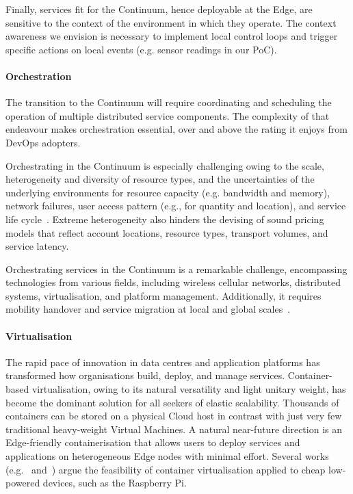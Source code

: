 Finally, services fit for the Continuum, hence deployable at the Edge, are sensitive to the context of the environment in which they operate.
The context awareness we envision is necessary to implement local control loops and trigger specific actions on local events (e.g. sensor readings in our PoC).

\paragraph{Orchestration}\label{p:orchestration}

The transition to the Continuum will require coordinating and scheduling the operation of multiple distributed service components. The complexity of that endeavour makes orchestration essential, over and above the rating it enjoys from DevOps adopters. 

Orchestrating in the Continuum is especially challenging owing to the scale, heterogeneity and diversity of resource types, and the uncertainties of the underlying environments for resource capacity (e.g. bandwidth and memory), network failures, user access pattern (e.g., for quantity and location), and service life cycle~\cite{BITTENCOURT2018134}.
Extreme heterogeneity also hinders the devising of sound pricing models that reflect account locations, resource types, transport volumes, and service latency.

Orchestrating services in the Continuum is a remarkable challenge, encompassing technologies from various fields, including wireless cellular networks, distributed systems, virtualisation, and platform management. Additionally, it requires mobility handover and service migration at local and global scales~\cite{Bittencourt201726}.

\paragraph{Virtualisation}\label{p:virtualisation}
\label{sec:virtualisation}

The rapid pace of innovation in data centres and application platforms has transformed how organisations build, deploy, and manage services.
Container-based virtualisation, owing to its natural versatility and light unitary weight, has become the dominant solution for all seekers of elastic scalability.
Thousands of containers can be stored on a physical Cloud host in contrast with just very few traditional heavy-weight Virtual Machines. 
A natural near-future direction is an Edge-friendly containerisation that allows users to deploy services and applications on heterogeneous Edge nodes with minimal effort. 
Several works (e.g.~\cite{pahl2016container} and~\cite{bellavista2017feasibility}) argue the feasibility of container virtualisation applied to cheap low-powered devices, such as the Raspberry Pi. 

